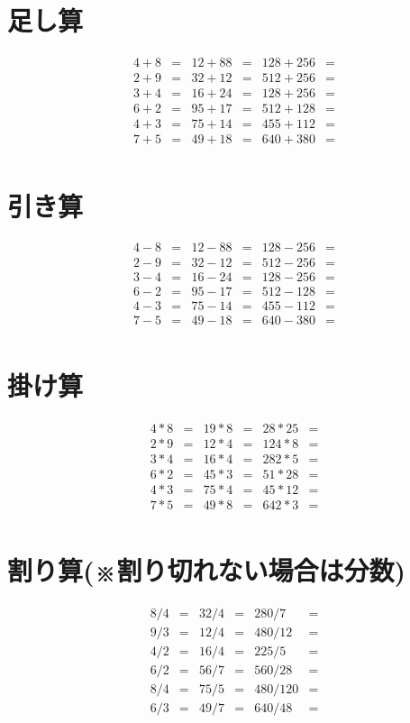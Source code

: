 \documentclass[paper=b4j,landscape,twocolumn,fleqn]{jlreq}
\begin{document}
\section{足し算}
\begin{align*}
  4+8&= & 12+88&= & 128+256&=\\
  2+9&= & 32+12&= & 512+256&=\\
  3+4&= & 16+24&= & 128+256&=\\
  6+2&= & 95+17&= & 512+128&=\\
  4+3&= & 75+14&= & 455+112&=\\
  7+5&= & 49+18&= & 640+380&=\\
\end{align*}
\section{引き算}
\begin{align*}
  4-8&= & 12-88&= & 128-256&=\\
  2-9&= & 32-12&= & 512-256&=\\
  3-4&= & 16-24&= & 128-256&=\\
  6-2&= & 95-17&= & 512-128&=\\
  4-3&= & 75-14&= & 455-112&=\\
  7-5&= & 49-18&= & 640-380&=\\
\end{align*}
\section{掛け算}
\begin{align*}
  4*8&= & 19*8&= & 28*25&=\\
  2*9&= & 12*4&= & 124*8&=\\
  3*4&= & 16*4&= & 282*5&=\\
  6*2&= & 45*3&= & 51*28&=\\
  4*3&= & 75*4&= & 45*12&=\\
  7*5&= & 49*8&= & 642*3&=\\
\end{align*}

\newpage
\section{割り算(※割り切れない場合は分数)}
\begin{align*}
  8/4&= & 32/4&= & 280/7&=\\
  9/3&= & 12/4&= & 480/12&=\\
  4/2&= & 16/4&= & 225/5&=\\
  6/2&= & 56/7&= & 560/28&=\\
  8/4&= & 75/5&= & 480/120&=\\
  6/3&= & 49/7&= & 640/48&=\\
\end{align*}
\end{document}
